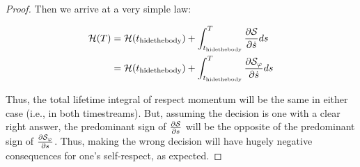 \documentclass{article}
\begin{document}
\begin{proof}
  Then we arrive at a very simple law:

  \begin{align*}
    {\mathcal H}(T) &= {\mathcal H}(t_{\mathrm{hide the body}}) +
    \int_{t_{\mathrm{hide the body}}}^T \frac{\partial{{\mathcal S}}}{\partial \dot{s}} ds \\
    &= {\mathcal H}(t_{\mathrm{hide the body}}) +
    \int_{t_{\mathrm{hide the body}}}^T \frac{\partial{{\mathcal S}_\varphi}}{\partial \dot{s}} ds \\
  \end{align*}

  Thus, the total lifetime integral of respect momentum will be the
  same in either case (i.e., in both timestreams). But, assuming the
  decision is one with a clear right answer, the predominant sign of
  $\frac{\partial {\mathcal S}}{\partial s}$ will be the opposite of the
  predominant sign of $\frac{\partial {\mathcal S}_\varphi}{\partial
    s}$. Thus, making the wrong decision will have hugely negative
  consequences for one's self-respect, as expected.
  
\end{proof}

 

\end{document}
